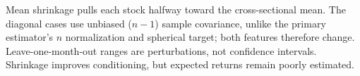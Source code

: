 Mean shrinkage pulls each stock halfway toward the cross-sectional mean.
The diagonal cases use unbiased ($n-1$) sample covariance, unlike the primary
estimator's $n$ normalization and spherical target; both features therefore
change. Leave-one-month-out ranges are perturbations, not confidence
intervals. Shrinkage improves conditioning, but expected returns remain poorly
estimated.
\FloatBarrier
